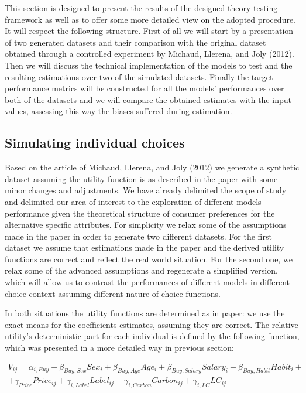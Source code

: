 \documentclass[12pt,]{article}
\begin{document}
This section is designed to present the results of the designed
theory-testing framework as well as to offer some more detailed view on
the adopted procedure. It will respect the following structure. First of
all we will start by a presentation of two generated datasets and their
comparison with the original dataset obtained through a controlled
experiment by Michaud, Llerena, and Joly (2012). Then we will discuss
the technical implementation of the models to test and the resulting
estimations over two of the simulated datasets. Finally the target
performance metrics will be constructed for all the models' performances
over both of the datasets and we will compare the obtained estimates
with the input values, assessing this way the biases suffered during
estimation.

\hypertarget{simulating-individual-choices}{%
\subsection{Simulating individual
choices}\label{simulating-individual-choices}}

Based on the article of Michaud, Llerena, and Joly (2012) we generate a
synthetic dataset assuming the utility function is as described in the
paper with some minor changes and adjustments. We have already delimited
the scope of study and delimited our area of interest to the exploration
of different models performance given the theoretical structure of
consumer preferences for the alternative specific attributes. For
simplicity we relax some of the assumptions made in the paper in order
to generate two different datasets. For the first dataset we assume that
estimations made in the paper and the derived utility functions are
correct and reflect the real world situation. For the second one, we
relax some of the advanced assumptions and regenerate a simplified
version, which will allow us to contrast the performances of different
models in different choice context assuming different nature of choice
functions.

In both situations the utility functions are determined as in paper: we
use the exact means for the coefficients estimates, assuming they are
correct. The relative utility's deterministic part for each individual
is defined by the following function, which was presented in a more
detailed way in previous section:

\begin{multline}
V_{ij} = \alpha_{i,Buy} + \beta_{Buy, Sex} Sex_i + \beta_{Buy, Age} Age_i + \beta_{Buy, Salary} Salary_i + \beta_{Buy, Habit} Habit_i + \\
+ \gamma_{Price} Price_{ij} + \gamma_{i, Label} Label_{ij} + \gamma_{i, Carbon} Carbon_{ij} + \gamma_{i, LC} LC_{ij}
\end{multline}
\end{document}
